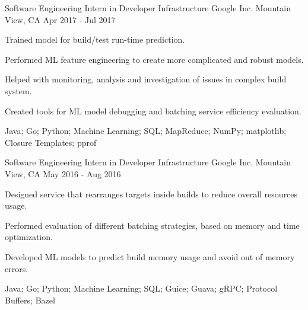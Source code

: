 \begin{cventries}
  \cventry
    {Software Engineering Intern in Developer Infrastructure} %
    {Google Inc.} %
    {Mountain View, CA} %
    {Apr 2017 - Jul 2017} %
    {
      \begin{cvitems} %
        \item {Trained model for build/test run-time prediction.}
        \item {Performed ML feature engineering to create more complicated and robust models.}
        \item {Helped with monitoring, analysis and investigation of issues in complex build system.}
        \item {Created tools for ML model debugging and batching service efficiency evaluation.}
        \item {Java; Go; Python; Machine Learning; SQL; MapReduce; NumPy; matplotlib; Closure Templates; pprof}
      \end{cvitems}
    }

  \cventry
    {Software Engineering Intern in Developer Infrastructure} %
    {Google Inc.} %
    {Mountain View, CA} %
    {May 2016 - Aug 2016} %
    {
      \begin{cvitems} %
        \item {Designed service that rearranges targets inside builds to reduce overall resources usage.}
        \item {Performed evaluation of different batching strategies, based on memory and time optimization.}
        \item {Developed ML models to predict build memory usage and avoid out of memory errors.}
        \item {Java; Go; Python; Machine Learning; SQL; Guice; Guava; gRPC; Protocol Buffers; Bazel}
      \end{cvitems}
    }
\end{cventries}
